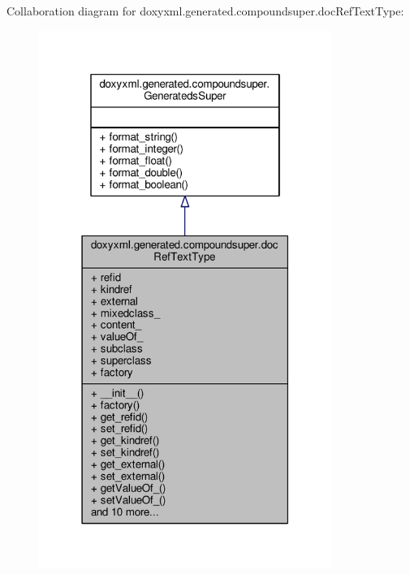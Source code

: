 Collaboration diagram for doxyxml.\+generated.\+compoundsuper.\+doc\+Ref\+Text\+Type\+:
\nopagebreak
\begin{figure}[H]
\begin{center}
\leavevmode
\includegraphics[width=270pt]{d2/de5/classdoxyxml_1_1generated_1_1compoundsuper_1_1docRefTextType__coll__graph}
\end{center}
\end{figure}
